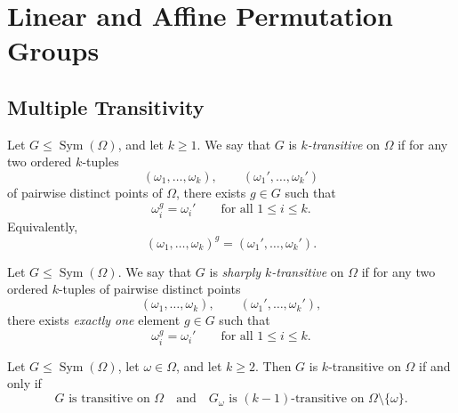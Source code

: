 
\providecommand{\GL}{\operatorname{GL}}
\providecommand{\PGL}{\operatorname{PGL}}
\providecommand{\AGL}{\operatorname{AGL}}
\providecommand{\Hol}{\operatorname{Hol}}
\providecommand{\Sym}{\operatorname{Sym}}

\chapter{Linear and Affine Permutation Groups}

\section{Multiple Transitivity}

\begin{definition}
Let \(G\leq \Sym(\Omega)\), and let \(k\geq 1\). We say that \(G\) is
\emph{\(k\)-transitive} on \(\Omega\) if for any two ordered \(k\)-tuples
\[
    (\omega_1,\ldots,\omega_k),\qquad (\omega_1',\ldots,\omega_k')
\]
of pairwise distinct points of \(\Omega\), there exists \(g\in G\) such that
\[
    \omega_i^g=\omega_i'
    \qquad\text{for all }1\leq i\leq k.
\]
Equivalently,
\[
    (\omega_1,\ldots,\omega_k)^g
    =
    (\omega_1',\ldots,\omega_k').
\]
\end{definition}

\begin{definition}
Let \(G\leq \Sym(\Omega)\). We say that \(G\) is
\emph{sharply \(k\)-transitive} on \(\Omega\) if for any two ordered \(k\)-tuples
of pairwise distinct points
\[
    (\omega_1,\ldots,\omega_k),\qquad
    (\omega_1',\ldots,\omega_k'),
\]
there exists \emph{exactly one} element \(g\in G\) such that
\[
    \omega_i^g=\omega_i'
    \qquad\text{for all }1\leq i\leq k.
\]
\end{definition}

\begin{proposition}
Let \(G\leq \Sym(\Omega)\), let \(\omega\in \Omega\), and let \(k\geq 2\).
Then \(G\) is \(k\)-transitive on \(\Omega\) if and only if
\[
    G \text{ is transitive on } \Omega
    \quad\text{and}\quad
    G_\omega \text{ is }(k-1)\text{-transitive on }\Omega\setminus\{\omega\}.
\]
\end{proposition}

